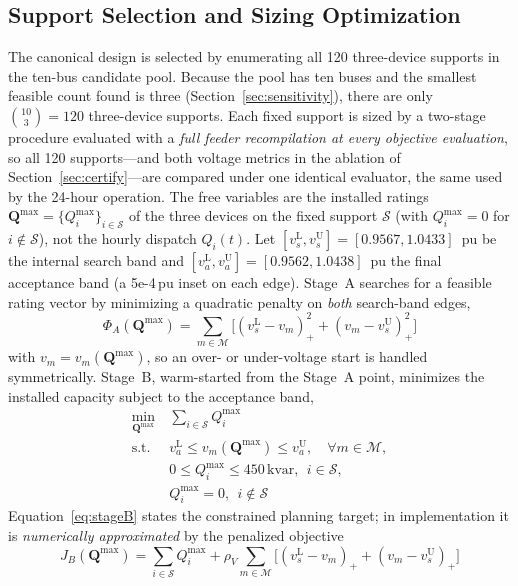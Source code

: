 \documentclass{ieeeaccess}
\newcommand{\SI}[2]{#1\,\ensuremath{\mathrm{#2}}}
\newcommand{\kvar}{\text{kvar}}
\newcommand{\Qmax}{Q^{\max}}
\begin{document}
\subsection{Support Selection and Sizing Optimization}
\label{sec:sizing}
The canonical design is selected by enumerating all 120 three-device supports in
the ten-bus candidate pool. Because the pool has ten buses and the smallest
feasible count found is three (Section~\ref{sec:sensitivity}), there are only
$\binom{10}{3}=120$ three-device supports. Each fixed support is sized by a
two-stage procedure evaluated with a \emph{full feeder recompilation at every
objective evaluation}, so all 120 supports---and both voltage metrics in the
ablation of Section~\ref{sec:certify}---are compared under one identical evaluator,
the same used by the 24-hour operation. The free variables are the installed
ratings $\mathbf Q^{\max}=\{\Qmax_i\}_{i\in\mathcal S}$ of the three devices on the
fixed support $\mathcal S$ (with $\Qmax_i=0$ for $i\notin\mathcal S$), not the hourly
dispatch $Q_i(t)$. Let $[v^{\mathrm L}_s,v^{\mathrm U}_s]=[0.9567,1.0433]$~pu be the
internal search band and $[v^{\mathrm L}_a,v^{\mathrm U}_a]=[0.9562,1.0438]$~pu the
final acceptance band (a \SI{5e-4}{pu} inset on each edge). Stage~A searches for a
feasible rating vector by minimizing a quadratic penalty on \emph{both} search-band
edges,
\begin{equation}
\Phi_A(\mathbf Q^{\max})=\sum_{m\in\mathcal M}\Big[(v^{\mathrm L}_s-v_m)_+^2
+(v_m-v^{\mathrm U}_s)_+^2\Big]
\label{eq:stageA}
\end{equation}
with $v_m=v_m(\mathbf Q^{\max})$, so an over- or under-voltage start is handled
symmetrically. Stage~B, warm-started from the Stage~A point, minimizes the installed
capacity subject to the acceptance band,
\begin{equation}
\begin{aligned}
\min_{\mathbf Q^{\max}}\ &\sum_{i\in\mathcal S}\Qmax_i\\
\text{s.t.}\ &v^{\mathrm L}_a\le v_m(\mathbf Q^{\max})\le v^{\mathrm U}_a,
\quad \forall m\in\mathcal M,\\
&0\le\Qmax_i\le\SI{450}{\kvar},\ \ i\in\mathcal S,\\
&\Qmax_i=0,\ \ i\notin\mathcal S
\end{aligned}
\label{eq:stageB}
\end{equation}
Equation~\eqref{eq:stageB} states the constrained planning target; in implementation
it is \emph{numerically approximated} by the penalized objective
\begin{equation}
J_B(\mathbf Q^{\max})=\sum_{i\in\mathcal S}\Qmax_i
+\rho_V\!\sum_{m\in\mathcal M}\big[(v^{\mathrm L}_s-v_m)_+ + (v_m-v^{\mathrm U}_s)_+\big]
\label{eq:stageBimpl}
\end{equation}
\end{document}
